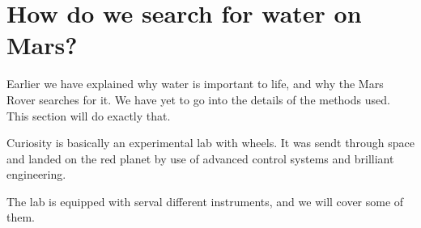 \section*{How do we search for water on Mars?}
Earlier we have explained why water is important to life, and why the Mars Rover searches for it.
We have yet to go into the details of the methods used.
This section will do exactly that.

Curiosity is basically an experimental lab with wheels.
It was sendt through space and landed on the red planet by use of advanced control systems and brilliant engineering.

The lab is equipped with serval different instruments, and we will cover some of them.